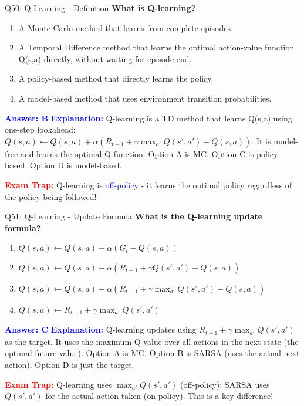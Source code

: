 \documentclass[8pt]{beamer}
\begin{document}
	\begin{frame}{Q50: Q-Learning - Definition}
		\fontsize{6.5}{7.5}\selectfont
		\textbf{What is Q-learning?}
		
		\begin{enumerate}
			\item A Monte Carlo method that learns from complete episodes.
			\item A Temporal Difference method that learns the optimal action-value function Q(s,a) directly, without waiting for episode end.
			\item A policy-based method that directly learns the policy.
			\item A model-based method that uses environment transition probabilities.
		\end{enumerate}
		
		\vspace{0.1cm}
		\textcolor{blue}{\textbf{Answer: B}}
		\vspace{0.1cm}
		\textcolor{blue}{\textbf{Explanation:}} Q-learning is a TD method that learns Q(s,a) using one-step lookahead: $Q(s,a) \leftarrow Q(s,a) + \alpha(R_{t+1} + \gamma \max_{a'} Q(s',a') - Q(s,a))$. It is model-free and learns the optimal Q-function. Option A is MC. Option C is policy-based. Option D is model-based.
		
		\textcolor{red}{\textbf{Exam Trap:}} Q-learning is \textcolor{blue}{off-policy} - it learns the optimal policy regardless of the policy being followed!
	\end{frame}
	
	\begin{frame}{Q51: Q-Learning - Update Formula}
		\fontsize{6.5}{7.5}\selectfont
		\textbf{What is the Q-learning update formula?}
		
		\begin{enumerate}
			\item $Q(s,a) \leftarrow Q(s,a) + \alpha(G_t - Q(s,a))$
			\item $Q(s,a) \leftarrow Q(s,a) + \alpha(R_{t+1} + \gamma Q(s',a') - Q(s,a))$
			\item $Q(s,a) \leftarrow Q(s,a) + \alpha(R_{t+1} + \gamma \max_{a'} Q(s',a') - Q(s,a))$
			\item $Q(s,a) \leftarrow R_{t+1} + \gamma \max_{a'} Q(s',a')$
		\end{enumerate}
		
		\vspace{0.1cm}
		\textcolor{blue}{\textbf{Answer: C}}
		\vspace{0.1cm}
		\textcolor{blue}{\textbf{Explanation:}} Q-learning updates using $R_{t+1} + \gamma \max_{a'} Q(s',a')$ as the target. It uses the maximum Q-value over all actions in the next state (the optimal future value). Option A is MC. Option B is SARSA (uses the actual next action). Option D is just the target.
		
		\textcolor{red}{\textbf{Exam Trap:}} Q-learning uses $\max_{a'} Q(s',a')$ (off-policy); SARSA uses $Q(s',a')$ for the actual action taken (on-policy). This is a key difference!
	\end{frame}
	
\end{document}
